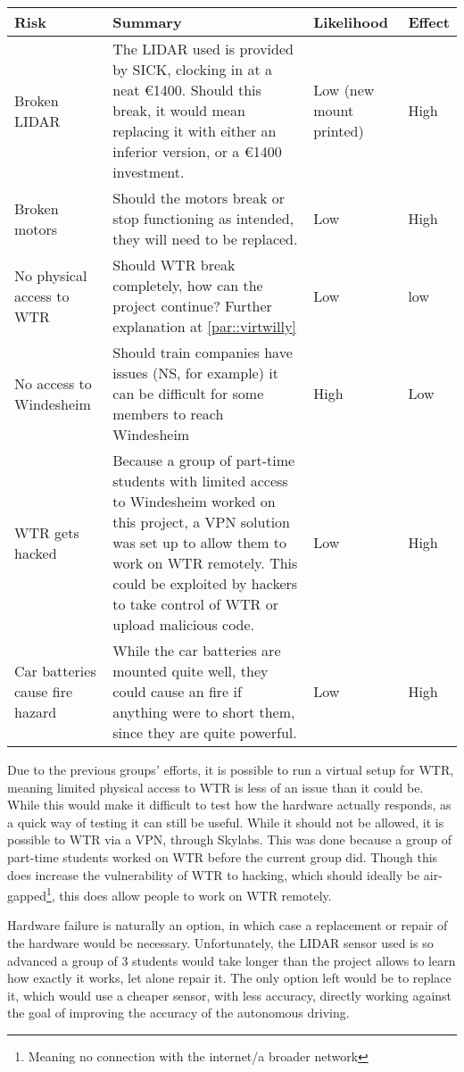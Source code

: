 \begin{tabular}{|L{6cm}|L{6cm}|l|l|}
\hline
Risk			 	& Summary			& Likelihood 		& Effect \\ \hline
Broken LIDAR 	& The LIDAR used is provided by SICK, clocking in at a neat \euro 1400. Should this break, it would mean replacing it with either an inferior version, or a \euro 1400 investment. & Low (new mount printed) & High \\ \hline
Broken motors 	& Should the motors break or stop functioning as intended, they will need to be replaced. & Low & High \\ \hline
No physical access to WTR & Should WTR break completely, how can the project continue? Further explanation at \ref{par::virtwilly} & Low & low \\ \hline
No access to Windesheim & Should train companies have issues (NS, for example) it can be difficult for some members to reach Windesheim & 
High & Low \\ \hline
WTR gets hacked  & Because a group of part-time students with limited access to Windesheim worked on this project, a VPN solution was set up to allow them to work on WTR remotely. This could be exploited by hackers to take control of WTR or upload malicious code. & Low  & High \\ \hline
Car batteries cause fire hazard & While the car batteries are mounted quite well, they could cause an fire if anything were to short them, since they are quite powerful. & Low & High \\ \hline

\end{tabular}

Due to the previous groups' efforts, it is possible to run a virtual setup for WTR, meaning limited physical access to WTR is less of an issue than it could be\label{virtwilly}.
While this would make it difficult to test how the hardware actually responds, as a quick way of testing it can still be useful.
While it should not be allowed, it is possible to WTR via a VPN, through Skylabs.
This was done because a group of part-time students worked on WTR before the current group did.
Though this does increase the vulnerability of WTR to hacking, which should ideally be air-gapped\footnote{Meaning no connection with the internet/a broader network}, this does allow people to work on WTR remotely.

Hardware failure is naturally an option, in which case a replacement or repair of the hardware would be necessary.
Unfortunately, the LIDAR sensor used is so advanced a group of 3 students would take longer than the project allows to learn how exactly it works, let alone repair it.
The only option left would be to replace it, which would use a cheaper sensor, with less accuracy, directly working against the goal of improving the accuracy of the autonomous driving.

